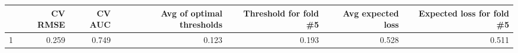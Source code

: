 
\begin{tabular}{lrrrrrr}
\toprule
  & CV RMSE & CV AUC & Avg of optimal thresholds & Threshold for fold \#5 & Avg expected loss & Expected loss for fold \#5\\
\midrule
1 & 0.259 & 0.749 & 0.123 & 0.193 & 0.528 & 0.511\\
\bottomrule
\end{tabular}